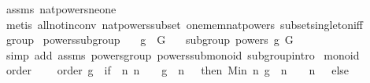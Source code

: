 \begin{isabellebody}
%
\isatagproof
{}\isamarkupfalse%
\ assms\ nat{\isacharunderscore}{\kern0pt}powers{\isacharunderscore}{\kern0pt}ne{\isacharunderscore}{\kern0pt}one\ \isanewline
\ \ \isamarkupfalse%
\ {\isacharparenleft}{\kern0pt}metis\ all{\isacharunderscore}{\kern0pt}not{\isacharunderscore}{\kern0pt}in{\isacharunderscore}{\kern0pt}conv\ nat{\isacharunderscore}{\kern0pt}powers{\isacharunderscore}{\kern0pt}subset\ one{\isacharunderscore}{\kern0pt}mem{\isacharunderscore}{\kern0pt}nat{\isacharunderscore}{\kern0pt}powers\ subset{\isacharunderscore}{\kern0pt}singleton{\isacharunderscore}{\kern0pt}iff{\isacharparenright}{\kern0pt}%
\endisatagproof
{\isafoldproof}%
%
\isadelimproof
%
\endisadelimproof
\isanewline
\isanewline
{}\isamarkupfalse%
\isanewline
\isanewline
{}\isamarkupfalse%
\ group\isanewline
\isanewline
{}\isanewline
\isanewline
{}\isamarkupfalse%
\ powers{\isacharunderscore}{\kern0pt}subgroup{\isacharcolon}{\kern0pt}\isanewline
\ \ \ {\isachardoublequoteopen}g\ {\isasymin}\ G{\isachardoublequoteclose}\isanewline
\ \ \ {\isachardoublequoteopen}subgroup\ {\isacharparenleft}{\kern0pt}powers\ g{\isacharparenright}{\kern0pt}\ G\ {\isacharparenleft}{\kern0pt}{\isasymcdot}{\isacharparenright}{\kern0pt}\ {\isasymone}{\isachardoublequoteclose}\ \isanewline
%
\isadelimproof
\ \ %
\endisadelimproof
%
\isatagproof
{}\isamarkupfalse%
\ {\isacharparenleft}{\kern0pt}simp\ add{\isacharcolon}{\kern0pt}\ assms\ powers{\isacharunderscore}{\kern0pt}group\ powers{\isacharunderscore}{\kern0pt}submonoid\ subgroup{\isachardot}{\kern0pt}intro{\isacharparenright}{\kern0pt}%
\endisatagproof
{\isafoldproof}%
%
\isadelimproof
\isanewline
%
\endisadelimproof
\isanewline
{}\isamarkupfalse%
\isanewline
\isanewline
{}\isamarkupfalse%
\ monoid\isanewline
\isanewline
{}%
\isadelimdocument
%
\endisadelimdocument
%
\isatagdocument
%
\isamarkuptrue%
%
\endisatagdocument
{\isafolddocument}%
%
\isadelimdocument
%
\endisadelimdocument
{}\isamarkupfalse%
\ order\ \isanewline
\ \ \ {\isachardoublequoteopen}order\ g\ {\isacharequal}{\kern0pt}\ {\isacharparenleft}{\kern0pt}if\ {\isacharparenleft}{\kern0pt}{\isasymexists}\ n{\isachardot}{\kern0pt}\ n\ {\isachargreater}{\kern0pt}\ {}\ {\isasymand}\ g\ {\isacharcircum}{\kern0pt}\ n\ {\isacharequal}{\kern0pt}\ {\isasymone}{\isacharparenright}{\kern0pt}\ then\ Min\ {\isacharbraceleft}{\kern0pt}n{\isachardot}{\kern0pt}\ g\ {\isacharcircum}{\kern0pt}\ n\ {\isacharequal}{\kern0pt}\ {\isasymone}\ {\isasymand}\ n\ {\isachargreater}{\kern0pt}\ {}{\isacharbraceright}{\kern0pt}\ else\ {}{\isacharparenright}{\kern0pt}{\isachardoublequoteclose}\isanewline

\end{isabellebody}
